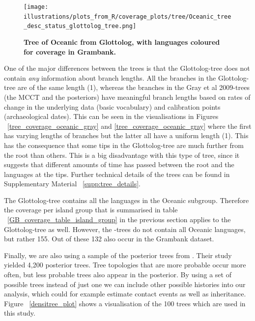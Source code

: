 \documentclass[a4paper,10pt]{article} %
\begin{document}
\begin{figure}[H]
\centering
\texttt{[image: illustrations/plots\_from\_R/coverage\_plots/tree/Oceanic\_tree\_desc\_status\_glottolog\_tree.png]}
\caption{\textbf{Tree of Oceanic from Glottolog, with languages coloured for coverage in Grambank.}}
\label{tree_coverage_oceanic_glottolog}
\end{figure}

One of the major differences between the trees is that the Glottolog-tree does not contain \emph{any} information about branch lengths. All the branches in the Glottolog-tree are of the same length (1), whereas the branches in the Gray et al 2009-trees (the MCCT and the posteriors) have meaningful branch lengths based on rates of change in the underlying data (basic vocabulary) and calibration points (archaeological dates). This can be seen in the visualisations in Figures ~\ref{tree_coverage_oceanic_gray} and \ref{tree_coverage_oceanic_gray} where the first has varying lengths of branches but the latter all have a uniform length (1). This has the consequence that some tips in the Glottolog-tree are much further from the root than others. This is a big disadvantage with this type of tree, since it suggests that different amounts of time has passed between the root and the languages at the tips. Further technical details of the trees can be found in Supplementary Material ~\ref{supp:tree_details}.

The Glottolog-tree contains all the languages in the Oceanic subgroup. Therefore the coverage per island group that is summarised in table ~\ref{GB_coverage_table_island_group} in the previous section applies to the Glottolog-tree as well. However, the \cite{grayetal_2009}-trees do not contain all Oceanic languages, but rather 155. Out of these 132 also occur in the Grambank dataset. %

Finally, we are also using a sample of the posterior trees from \cite{grayetal_2009}. Their study yielded 4,200 posterior trees. Tree topologies that are more probable occur more often, but less probable trees also appear in the posterior. By using a set of possible trees instead of just one we can include other possible histories into our analysis, which could for example estimate contact events as well as inheritance. Figure ~\ref{densitree_plot} shows a visualisation of the 100 trees which are used in this study.
\end{document}
